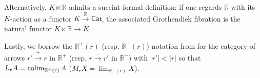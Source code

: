 \documentclass[a4paper,10pt
 ,draft
]{article}%
\begin{document}
Alternatively, $K \ltimes \mathbb{R}$
admits a succint formal definition: 
if one regards $\mathbb{R}$ with its $K$-action as a
functor $ %
K \xrightarrow{\mathbb{R}} \mathsf{Cat}$, 
 the associated Grothendiek fibration is the natural functor $K \ltimes \mathbb{R} \to K$.%






Lastly, we borrow the $\mathbb{R}^+(r)$ (resp. $\mathbb{R}^-(r)$) notation from \cite{BM11} for
the category of arrows
$r' \xrightarrow{+} r$ in $\mathbb{R}^+$
(resp. 
$r \xrightarrow{-} r'$ in $\mathbb{R}^-$)
with $|r'|<|r|$
so that
$L_r A = \mathop{\operatorname{colim}}_{\mathbb{R}^+(r)}A$
($M_r X = \mathop{\lim}_{\mathbb{R}^-(r)}X$).
\end{document}
